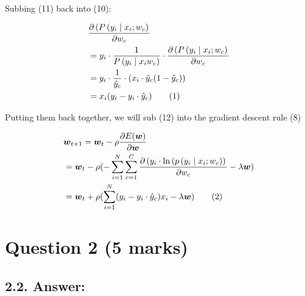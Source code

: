 \documentclass{article}
\newcommand\numberthis{\addtocounter{equation}{1}\tag{\theequation}}
\begin{document}
Subbing (11) back into (10):

\begin{align*}
    & \frac{\partial\left(P\left(y_i \mid x_i ; w_c\right)\right.}{\partial w_c} \\
    & = y_i \cdot \frac{1}{P\left(y_i \mid x_{i} w_c\right)} \cdot \frac{\partial\left(P\left(y_i \mid x_i ; w_c\right)\right.}{\partial w_c} \\
    & = y_i \cdot \frac{1}{\hat{y}_c} \cdot (x_i \cdot \hat{y}_c(1-\hat{y}_c)) \\
    & = x_i(y_i-y_i \cdot \hat{y}_c) \numberthis \label{eqn}
\end{align*}

Putting them back together, we will sub (12) into the gradient descent rule (8)

\begin{align*}
    & \boldsymbol{w}_{t+1}=\boldsymbol{w}_t-\rho \frac{\partial E(\boldsymbol{w})}{\partial \boldsymbol{w}} \\
    & =  \boldsymbol{w}_t-\rho (-\sum_{i=1}^N \sum_{c=1}^C \frac{\partial\left(y_i \cdot \ln \left(p\left(y_i \mid x_i ; w_c\right)\right)\right.}{\partial w_c} - \lambda \boldsymbol{w}) \\
    & = \boldsymbol{w}_t+\rho (\sum_{i=1}^N (y_i-y_i \cdot \hat{y}_c)x_i - \lambda \boldsymbol{w}) \numberthis \label{eqn}
\end{align*}


\section{Question 2 (5 marks)}

\subsection*{2.2. Answer:}
\begin{table}[!hbt]
    \centering
    \caption{Classification accuracy on running linear kernel SVM on 3-fold cross-validation using training set with different values of the parameter C in \{0.01, 0.05, 0.1, 0.5, 1\}}
    \label{tab:linearSVM}
\end{table}
\end{document}
